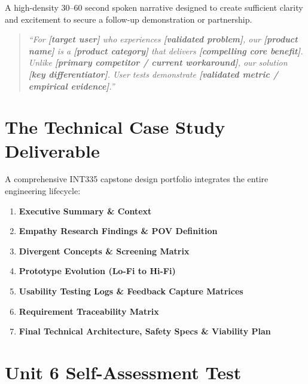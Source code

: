 \begin{definition}
A high-density 30--60 second spoken narrative designed to create sufficient clarity and excitement to secure a follow-up demonstration or partnership.
\end{definition}

\begin{keyequation}
\begin{quote}
\textit{``For \textbf{[target user]} who experiences \textbf{[validated problem]}, our \textbf{[product name]} is a \textbf{[product category]} that delivers \textbf{[compelling core benefit]}. Unlike \textbf{[primary competitor / current workaround]}, our solution \textbf{[key differentiator]}. User tests demonstrate \textbf{[validated metric / empirical evidence]}.''}
\end{quote}
\end{keyequation}

\section{The Technical Case Study Deliverable}

A comprehensive INT335 capstone design portfolio integrates the entire engineering lifecycle:
\begin{enumerate}[leftmargin=1.2em, itemsep=2pt]
    \item \textbf{Executive Summary \& Context}
    \item \textbf{Empathy Research Findings \& POV Definition}
    \item \textbf{Divergent Concepts \& Screening Matrix}
    \item \textbf{Prototype Evolution (Lo-Fi to Hi-Fi)}
    \item \textbf{Usability Testing Logs \& Feedback Capture Matrices}
    \item \textbf{Requirement Traceability Matrix}
    \item \textbf{Final Technical Architecture, Safety Specs \& Viability Plan}
\end{enumerate}

\section{Unit 6 Self-Assessment Test}

